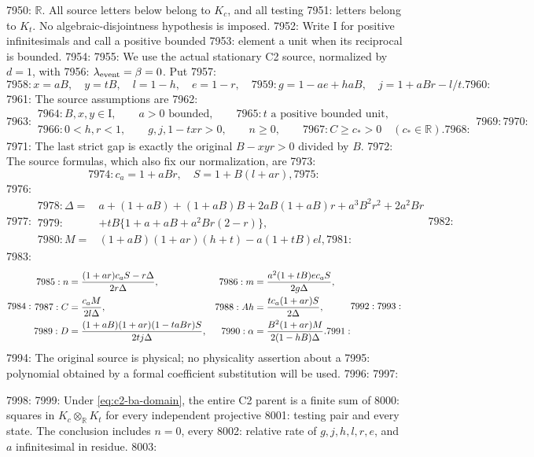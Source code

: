 7950: $\mathbb R$. All source letters below belong to $K_c$, and all testing
7951: letters belong to $K_t$. No algebraic-disjointness hypothesis is imposed.
7952: Write $\mathrm I$ for positive infinitesimals and call a positive bounded
7953: element a unit when its reciprocal is bounded.
7954: 
7955: We use the actual stationary C2 source, normalized by $d=1$, with
7956: $\lambda_{\rm event}=\beta=0$. Put
7957: \[
7958:  x=aB,\quad y=tB,\quad l=1-h,\quad e=1-r,\quad
7959:  g=1-ae+haB,\quad j=1+aBr-l/t.
7960: \]
7961: The source assumptions are
7962: \begin{equation}
7963:  \begin{gathered}
7964:  B,x,y\in\mathrm I,\qquad a>0\text{ bounded},\qquad
7965:  t\text{ a positive bounded unit},\\
7966:  0<h,r<1,\qquad g,j,1-txr>0,\qquad n\ge0,\qquad
7967:  C\ge c_*>0\quad(c_*\in\mathbb R).
7968:  \end{gathered}
7969:  \label{eq:c2-ba-domain}
7970: \end{equation}
7971: The last strict gap is exactly the original $B-xyr>0$ divided by $B$.
7972: The source formulas, which also fix our normalization, are
7973: \[
7974:  c_a=1+aBr,\quad S=1+B(l+ar),
7975: \]
7976: \[
7977:  \begin{split}
7978:  \Delta={}&a+(1+aB)+(1+aB)B+2aB(1+aB)r+a^3B^2r^2+2a^2Br\\
7979:  &+tB\{1+a+aB+a^2Br(2-r)\},\\
7980:  M={}&(1+aB)(1+ar)(h+t)-a(1+tB)el,
7981:  \end{split}
7982: \]
7983: \begin{equation}
7984:  \begin{aligned}
7985:  n&={ (1+ar)c_aS-r\Delta\over2r\Delta},&
7986:  m&={a^2(1+tB)e c_aS\over2g\Delta},\\
7987:  C&={c_aM\over2l\Delta},&
7988:  Ah&={t c_a(1+ar)S\over2\Delta},\\
7989:  D&={(1+aB)(1+ar)(1-taBr)S\over2t j\Delta},&
7990:  \alpha&={B^2(1+ar)M\over2(1-hB)\Delta}.
7991:  \end{aligned}
7992:  \label{eq:c2-ba-source}
7993: \end{equation}
7994: The original source is physical; no physicality assertion about a
7995: polynomial obtained by a formal coefficient substitution will be used.
7996: 
7997: \begin{proposition}
7998: \label{prop:c2-bounded-a}
7999: Under \eqref{eq:c2-ba-domain}, the entire C2 parent is a finite sum of
8000: squares in $K_c\otimes_{\mathbb R}K_t$ for every independent projective
8001: testing pair and every state. The conclusion includes $n=0$, every
8002: relative rate of $g,j,h,l,r,e$, and $a$ infinitesimal in residue.
8003: \end{proposition}
